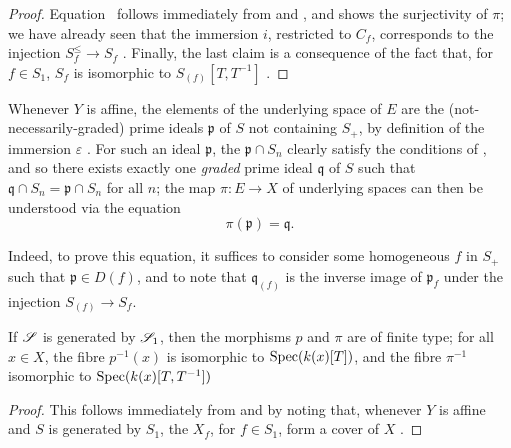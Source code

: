 \begin{proof}
Equation~ follows immediately from  and , and shows the surjectivity of $\pi$;
we have already seen that the immersion $i$, restricted to $C_f$, corresponds
to the injection $S_f^\leq\to S_f$ .
Finally, the last claim is a consequence of the fact that, for $f\in S_1$, $S_f$ is isomorphic to $S_{(f)}[T,T^{-1}]$ .
\end{proof}

\begin{remark}[8.3.7]
\label{II.8.3.7}
Whenever $Y$ is affine, the elements of the underlying space of $E$ are the (not-necessarily-graded) prime ideals $\mathfrak{p}$ of $S$ not containing $S_+$, by definition of the immersion $\varepsilon$ .
For such an ideal $\mathfrak{p}$, the $\mathfrak{p}\cap S_n$ clearly satisfy the conditions of , and so there exists exactly one \emph{graded} prime ideal $\mathfrak{q}$ of $S$ such that $\mathfrak{q}\cap S_n=\mathfrak{p}\cap S_n$ for all $n$;
the map $\pi:E\to X$ of underlying spaces can then be understood via the equation
\[
\label{II.8.3.7.1}
  \pi(\mathfrak{p}) = \mathfrak{q}.
\tag{8.3.7.1}
\]

Indeed, to prove this equation, it suffices to consider some homogeneous $f$ in $S_+$ such that $\mathfrak{p}\in D(f)$, and to note that $\mathfrak{q}_{(f)}$ is the inverse image of $\mathfrak{p}_f$ under the injection $S_{(f)}\to S_f$.
\end{remark}

\begin{corollary}[8.3.8]
\label{II.8.3.8}
If $\mathscr{S}$ is generated by $\mathscr{S}_1$, then the morphisms $p$ and $\pi$ are of finite type;
for all $x\in X$, the fibre $p^{-1}(x)$ is isomorphic to $\operatorname{Spec}(k(x)[T])$, and the fibre $\pi^{-1}$ isomorphic to $\operatorname{Spec}(k(x)[T,T^{-1}])$
\end{corollary}

\begin{proof}
This follows immediately from  and  by noting that, whenever $Y$ is affine and $S$ is generated by $S_1$, the $X_f$, for $f\in S_1$, form a cover of $X$ .
\end{proof}


